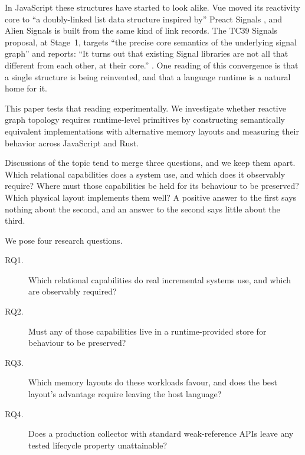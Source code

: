 \documentclass[11pt]{article}
\begin{document}
In JavaScript these structures have started to look alike. Vue moved its reactivity core to ``a doubly-linked list data structure inspired by'' Preact Signals \cite{vue10397,preactsignals}, and Alien Signals \cite{aliensignals} is built from the same kind of link records. The TC39 Signals proposal, at Stage~1, targets ``the precise core semantics of the underlying signal graph'' and reports: ``It turns out that existing Signal libraries are not all that different from each other, at their core.'' \cite{tc39signals}. One reading of this convergence is that a single structure is being reinvented, and that a language runtime is a natural home for it.

This paper tests that reading experimentally. We investigate whether reactive graph topology requires runtime-level primitives by constructing semantically equivalent implementations with alternative memory layouts and measuring their behavior across JavaScript and Rust.

Discussions of the topic tend to merge three questions, and we keep them apart. Which relational capabilities does a system use, and which does it observably require? Where must those capabilities be held for its behaviour to be preserved? Which physical layout implements them well? A positive answer to the first says nothing about the second, and an answer to the second says little about the third.

We pose four research questions.

\begin{description}
\item[RQ1.] Which relational capabilities do real incremental systems use, and which are observably required?
\item[RQ2.] Must any of those capabilities live in a runtime-provided store for behaviour to be preserved?
\item[RQ3.] Which memory layouts do these workloads favour, and does the best layout's advantage require leaving the host language?
\item[RQ4.] Does a production collector with standard weak-reference APIs leave any tested lifecycle property unattainable?
\end{description}
\end{document}
